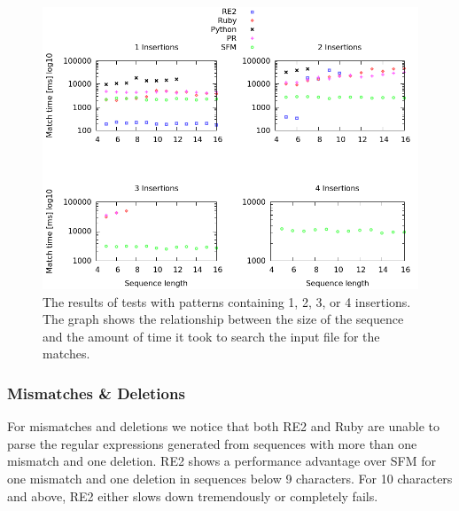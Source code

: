 \documentclass[12pt]{article}
\theoremstyle{definition}
\begin{document}
\begin{figure}[H]
	\begin{center}
		\includegraphics[scale=0.55]{graphs/insertions.png}	
	\end{center}
	\caption{The results of tests with patterns containing 1, 2, 3, or 4 insertions. The graph shows the relationship between the size of the sequence and the amount of time it took to search the input file for the matches.}
	\label{graph:cases:insertions}
\end{figure}

\subsubsection{Mismatches \& Deletions}

For mismatches and deletions we notice that both RE2 and Ruby are unable to parse the regular expressions generated from sequences with more than one mismatch and one deletion. RE2 shows a performance advantage over SFM for one mismatch and one deletion in sequences below 9 characters. For 10 characters and above, RE2 either slows down tremendously or completely fails.
\end{document}
